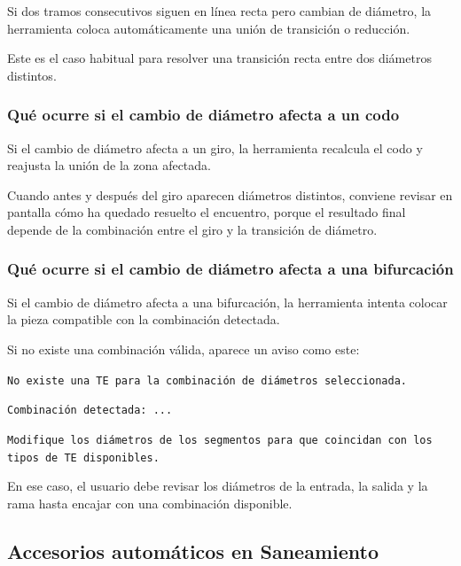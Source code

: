 Si dos tramos consecutivos siguen en línea recta pero cambian de diámetro, la herramienta coloca automáticamente una unión de transición o reducción.

Este es el caso habitual para resolver una transición recta entre dos diámetros distintos.


\subsubsection{Qué ocurre si el cambio de diámetro afecta a un codo}

Si el cambio de diámetro afecta a un giro, la herramienta recalcula el codo y reajusta la unión de la zona afectada.

Cuando antes y después del giro aparecen diámetros distintos, conviene revisar en pantalla cómo ha quedado resuelto el encuentro, porque el resultado final depende de la combinación entre el giro y la transición de diámetro.

\subsubsection{Qué ocurre si el cambio de diámetro afecta a una bifurcación}

Si el cambio de diámetro afecta a una bifurcación, la herramienta intenta colocar la pieza compatible con la combinación detectada.

Si no existe una combinación válida, aparece un aviso como este:

\texttt{No existe una TE para la combinación de diámetros seleccionada.}

\texttt{Combinación detectada: ...}

\texttt{Modifique los diámetros de los segmentos para que coincidan con los tipos de TE disponibles.}

En ese caso, el usuario debe revisar los diámetros de la entrada, la salida y la rama hasta encajar con una combinación disponible.


\subsection{Accesorios automáticos en Saneamiento}

